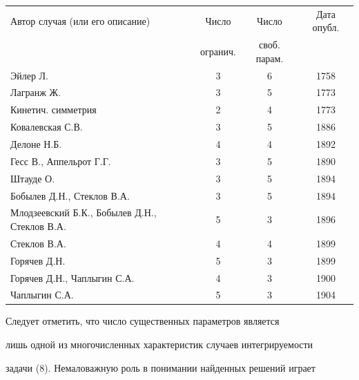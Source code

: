 \begin{tabular}{|lccc|}


\hline


Автор случая (или его описание) & Число & Число & Дата опубл.\\


\ & огранич. & своб. парам. & \ \\


\hline


Эйлер Л. & 3 & 6 & 1758 \\


Лагранж Ж. & 3 & 5 & 1773 \\


Кинетич. симметрия & 2 & 4 & 1773 \\


Ковалевская С.В. & 3 & 5 & 1886 \\


Делоне Н.Б. & 4 & 4 & 1892 \\


Гесс В., Аппельрот Г.Г. & 3 & 5 & 1890 \\


Штауде О. & 3 & 5 & 1894 \\


Бобылев Д.Н., Стеклов В.А. & 3 & 5 & 1894 \\


Млодзеевский Б.К., Бобылев Д.Н., Стеклов В.А. & 5 & 3 & 1896 \\


Стеклов В.А. & 4 & 4 & 1899 \\


Горячев Д.Н. & 5 & 3 & 1899 \\


Горячев Д.Н., Чаплыгин С.А. & 4 & 3 & 1900 \\


Чаплыгин С.А. & 5 & 3 & 1904 \\


\hline


\end{tabular}


\medskip





Следует отметить, что число существенных параметров является


лишь одной из многочисленных характеристик случаев интегрируемости


задачи (8). Немаловажную роль в понимании найденных решений играет


